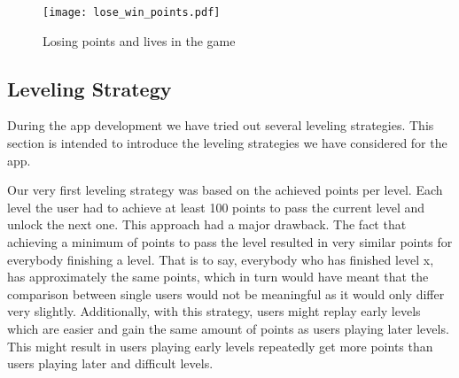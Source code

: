 \begin{figure}[hHtbp]
\centering
\texttt{[image: lose\_win\_points.pdf]}
\caption{Losing points and lives in the game}
\label{fig:lose_points_life}
\end{figure}
\subsection{Leveling Strategy}
\label{s:leveling}
During the app development we have tried out several leveling strategies.
 This section is intended to introduce the leveling strategies we have considered for the app.

\begin{description}[leftmargin=0cm]
	\item[Leveling Based on Achieved Points] Our very first leveling strategy was based on the achieved points per level.
 Each level the user had to achieve at least 100 points to pass the current level and unlock the next one.
 This approach had a major drawback.
 The fact that achieving a minimum of points to pass the level resulted in very similar points for everybody finishing a level.
 That is to say, everybody who has finished level x, has approximately the same points, which in turn would have meant that the comparison between single users would not be meaningful as it would only differ very slightly.
 Additionally, with this strategy, users might replay early levels which are easier and gain the same amount of points as users playing later levels.
 This might result in users playing early levels repeatedly get more points than users playing later and difficult levels.


\end{description}
